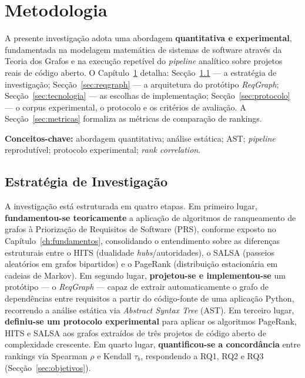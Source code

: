 \chapter{Metodologia}
\label{ch:metodologia}

A presente investigação adota uma abordagem
\textbf{quantitativa e experimental}, fundamentada na modelagem
matemática de sistemas de software através da Teoria dos Grafos e na
execução repetível do \emph{pipeline} analítico sobre projetos reais
de código aberto. O Capítulo~\ref{ch:metodologia} detalha:
Secção~\ref{sec:estrategia} --- a estratégia de investigação;
Secção~\ref{sec:reqgraph} --- a arquitetura do protótipo \emph{ReqGraph};
Secção~\ref{sec:tecnologia} --- as escolhas de implementação;
Secção~\ref{sec:protocolo} --- o corpus experimental, o protocolo
 e os critérios de avaliação. A Secção~\ref{sec:metricas}
formaliza as métricas de comparação de rankings.

\noindent\textbf{Conceitos-chave:} abordagem quantitativa; análise
estática; AST; \emph{pipeline} reprodutível; protocolo experimental;
\emph{rank correlation}.

\section{Estratégia de Investigação}
\label{sec:estrategia}

A investigação está estruturada em quatro etapas. Em primeiro lugar,
\textbf{fundamentou-se teoricamente} a aplicação de algoritmos de
ranqueamento de grafos à Priorização de Requisitos de Software (PRS),
conforme exposto no Capítulo~\ref{ch:fundamentos}, consolidando o
entendimento sobre as diferenças estruturais entre o HITS
(dualidade \emph{hubs}/autoridades), o SALSA (passeios aleatórios em
grafos bipartidos) e o PageRank (distribuição estacionária em cadeias
de Markov). Em segundo lugar, \textbf{projetou-se e implementou-se}
um protótipo --- o \emph{ReqGraph} --- capaz de extrair
automaticamente o grafo de dependências entre requisitos a partir do
código-fonte de uma aplicação Python, recorrendo a análise estática
via \emph{Abstract Syntax Tree} (AST). Em terceiro lugar,
\textbf{definiu-se um protocolo experimental} para aplicar os
algoritmos PageRank, HITS e SALSA aos grafos extraídos de três
projetos de código aberto de complexidade crescente. Em quarto lugar,
\textbf{quantificou-se a concordância} entre rankings via Spearman
$\rho$ e Kendall $\tau_b$, respondendo a RQ1, RQ2 e RQ3
(Secção~\ref{sec:objetivos}).

